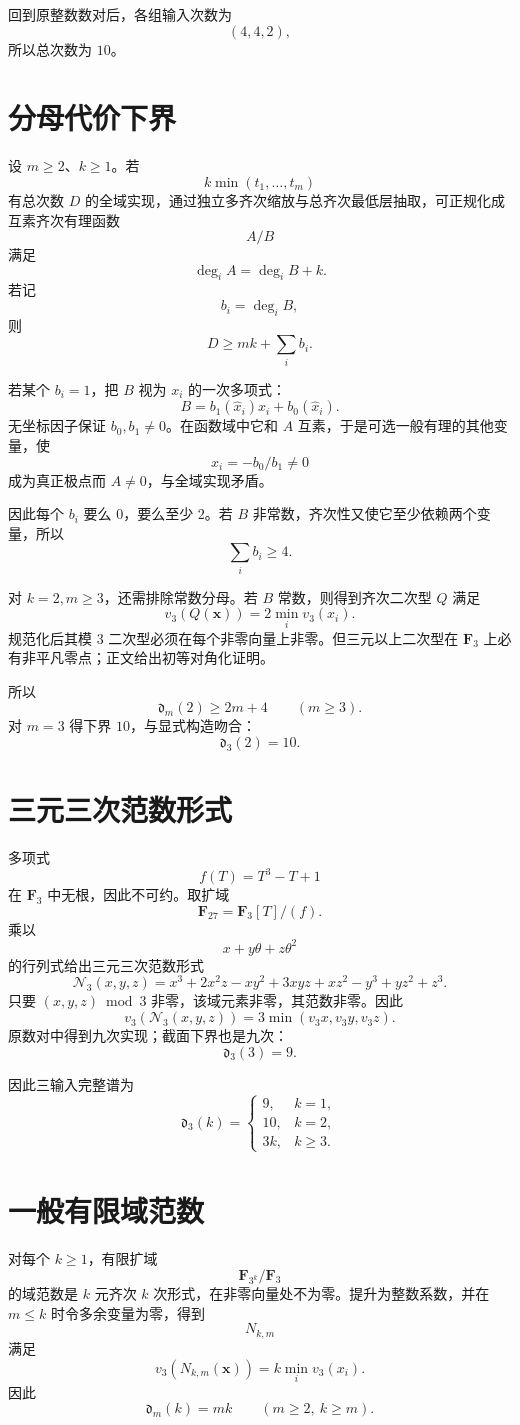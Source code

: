 \documentclass[11pt,a4paper]{ctexart}
\begin{document}
回到原整数数对后，各组输入次数为
\[
(4,4,2),
\]
所以总次数为 \(10\)。

\section{分母代价下界}
设 \(m\ge2\)、\(k\ge1\)。若
\[
k\min(t_1,\ldots,t_m)
\]
有总次数 \(D\) 的全域实现，通过独立多齐次缩放与总齐次最低层抽取，可正规化成互素齐次有理函数
\[
A/B
\]
满足
\[
\deg_iA=\deg_iB+k.
\]
若记
\[
b_i=\deg_iB,
\]
则
\[
\boxed{
D\ge mk+\sum_i b_i.
}
\]

若某个 \(b_i=1\)，把 \(B\) 视为 \(x_i\) 的一次多项式：
\[
B=b_1(\widehat x_i)x_i+b_0(\widehat x_i).
\]
无坐标因子保证 \(b_0,b_1\ne0\)。在函数域中它和 \(A\) 互素，于是可选一般有理的其他变量，使
\[
x_i=-b_0/b_1\ne0
\]
成为真正极点而 \(A\ne0\)，与全域实现矛盾。

因此每个 \(b_i\) 要么 \(0\)，要么至少 \(2\)。若 \(B\) 非常数，齐次性又使它至少依赖两个变量，所以
\[
\sum_i b_i\ge4.
\]

对 \(k=2,m\ge3\)，还需排除常数分母。若 \(B\) 常数，则得到齐次二次型 \(Q\) 满足
\[
v_3(Q(\mathbf x))
=
2\min_i v_3(x_i).
\]
规范化后其模 \(3\) 二次型必须在每个非零向量上非零。但三元以上二次型在 \(\mathbf F_3\) 上必有非平凡零点；正文给出初等对角化证明。

所以
\[
\boxed{
\mathfrak d_m(2)\ge2m+4
\qquad(m\ge3).
}
\]
对 \(m=3\) 得下界 \(10\)，与显式构造吻合：
\[
\boxed{\mathfrak d_3(2)=10.}
\]

\section{三元三次范数形式}
多项式
\[
f(T)=T^3-T+1
\]
在 \(\mathbf F_3\) 中无根，因此不可约。取扩域
\[
\mathbf F_{27}
=
\mathbf F_3[T]/(f).
\]
乘以
\[
x+y\theta+z\theta^2
\]
的行列式给出三元三次范数形式
\[
\mathcal N_3(x,y,z)
=
x^3+2x^2z-xy^2+3xyz+xz^2-y^3+yz^2+z^3.
\]
只要 \((x,y,z)\bmod3\) 非零，该域元素非零，其范数非零。因此
\[
\boxed{
v_3(\mathcal N_3(x,y,z))
=
3\min(v_3x,v_3y,v_3z).
}
\]
原数对中得到九次实现；截面下界也是九次：
\[
\boxed{\mathfrak d_3(3)=9.}
\]

因此三输入完整谱为
\[
\boxed{
\mathfrak d_3(k)=
\begin{cases}
9,&k=1,\\
10,&k=2,\\
3k,&k\ge3.
\end{cases}
}
\]

\section{一般有限域范数}
对每个 \(k\ge1\)，有限扩域
\[
\mathbf F_{3^k}/\mathbf F_3
\]
的域范数是 \(k\) 元齐次 \(k\) 次形式，在非零向量处不为零。提升为整数系数，并在 \(m\le k\) 时令多余变量为零，得到
\[
N_{k,m}
\]
满足
\[
v_3(N_{k,m}(\mathbf x))
=
k\min_i v_3(x_i).
\]
因此
\[
\boxed{
\mathfrak d_m(k)=mk
\qquad(m\ge2,\ k\ge m).
}
\]
\end{document}

